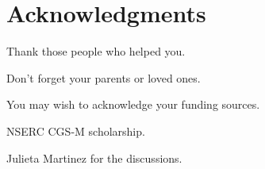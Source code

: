 
\chapter{Acknowledgments}

Thank those people who helped you. 

Don't forget your parents or loved ones.

You may wish to acknowledge your funding sources.

NSERC CGS-M scholarship.


Julieta Martinez for the discussions.
